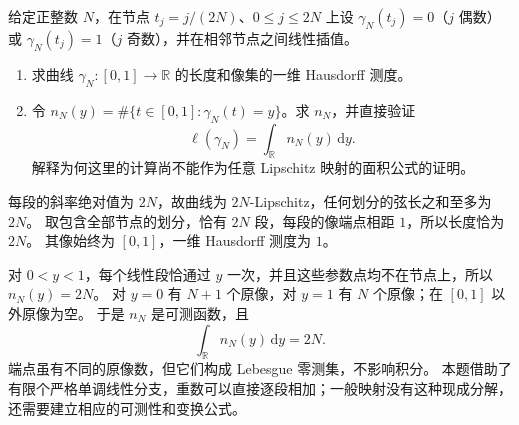 \begin{optionalexercise}\label{b1:ex:16-retracing-multiplicity}
给定正整数 \(N\)，在节点 \(t_j=j/(2N)\)、\(0\le j\le2N\) 上设
\(\gamma_N(t_j)=0\)（\(j\) 偶数）或 \(\gamma_N(t_j)=1\)（\(j\) 奇数），并在相邻节点之间线性插值。
\begin{enumerate}
\item\label{b1:item:16-retracing-length}
求曲线 \(\gamma_N:[0,1]\to\mathbb R\) 的长度和像集的一维 Hausdorff 测度。
\item\label{b1:item:16-retracing-count}
令 \(n_N(y)=\#\{t\in[0,1]:\gamma_N(t)=y\}\)。求 \(n_N\)，并直接验证
\[
 \ell(\gamma_N)=\int_{\mathbb R}n_N(y)\,\mathrm dy.
\]
解释为何这里的计算尚不能作为任意 Lipschitz 映射的面积公式的证明。
\end{enumerate}
\end{optionalexercise}
\begin{solution}
每段的斜率绝对值为 \(2N\)，故曲线为 \(2N\)-Lipschitz，任何划分的弦长之和至多为 \(2N\)。
取包含全部节点的划分，恰有 \(2N\) 段，每段的像端点相距 \(1\)，所以长度恰为 \(2N\)。
其像始终为 \([0,1]\)，一维 Hausdorff 测度为 \(1\)。

对 \(0<y<1\)，每个线性段恰通过 \(y\) 一次，并且这些参数点均不在节点上，所以 \(n_N(y)=2N\)。
对 \(y=0\) 有 \(N+1\) 个原像，对 \(y=1\) 有 \(N\) 个原像；在 \([0,1]\) 以外原像为空。
于是 \(n_N\) 是可测函数，且
\[
 \int_{\mathbb R}n_N(y)\,\mathrm dy=2N.
\]
端点虽有不同的原像数，但它们构成 Lebesgue 零测集，不影响积分。
本题借助了有限个严格单调线性分支，重数可以直接逐段相加；一般映射没有这种现成分解，还需要建立相应的可测性和变换公式。
\end{solution}

